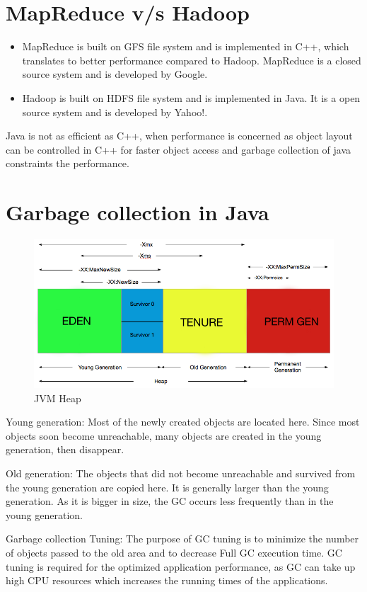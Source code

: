 \documentclass[twoside]{article}
\begin{document}
\section{MapReduce v/s Hadoop}

\begin{itemize}
\item MapReduce is built on GFS file system and is implemented in C++, which translates to better performance compared to Hadoop. MapReduce is a closed source system and is developed by Google.

\item Hadoop is built on HDFS file system and is implemented in Java. It is a open source system and is developed by Yahoo!.

\end{itemize}

Java is not as efficient as C++, when performance is concerned as object layout can be controlled in C++ for faster object access and garbage collection of java constraints the performance. 

\section{Garbage collection in Java}

\begin{figure}[ht]
  \centering
  \includegraphics[width=0.7\linewidth]{jvm_heap.png}
  \caption{JVM Heap}
  \vspace{-0.2cm}
  \label{fig:jvm_heap}
  \vspace{-0.2cm}
\end{figure}

Young generation: Most of the newly created objects are located here. Since most objects soon become unreachable, many objects are created in the young generation, then disappear. 

Old generation: The objects that did not become unreachable and survived from the young generation are copied here. It is generally larger than the young generation. As it is bigger in size, the GC occurs less frequently than in the young generation. 

Garbage collection Tuning: The purpose of GC tuning is to minimize the number of objects passed to the old area and to decrease Full GC execution time. GC tuning is required for the optimized application performance, as GC can take up high CPU resources which increases the running times of the applications.
\end{document}
